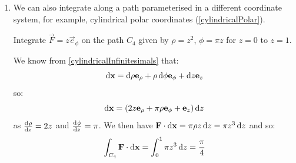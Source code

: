 \documentclass[../main.tex]{subfiles}
\begin{document}
\begin{example}
\begin{enumerate}
      We can parametrise this ellipse as $\vec{x}(\theta) = (a \cos \theta, b \sin \theta, 0)$ for $\theta \in [0, \frac{\pi}{2}]$.
      We then have:
      \[
        \vec{F}(\vec{x}(\theta)) = (b^2 \sin^2 \theta e^{a \cos \theta}, e^{b \sin \theta} + 2b\sin\theta e^{a \cos \theta}, 0)
      \]
      and:
      \[
        \deriv{\vec{x}}{\theta} = (-a \sin \theta, b \cos \theta, 0)
      \]
      so:
      \[
        \vec{F} \cdot \deriv{\vec{x}}{\theta} = -ab^2 \sin^3 \theta e^{a \cos \theta} + b \cos \theta e^{b \sin \theta} + 2b^2 \sin \theta \cos \theta e^{a \cos \theta}
      \]
      We can now evaluate the integral:
      \begin{align*}
        \int_{C_3} \vec{F} \cdot \d{\vec{x}} &= \eval{e^{b \sin \theta}}{0}{\pi/2} + \int_{0}^{\pi/2} b^2 \sin \theta e^{a \cos \theta} (-a + 2\cos \theta + a \cos^2 \theta) \d{\theta} \\
                                             &= e^{b} - 1 + \int_{1}^{0} b^2e^{au}(1 - 2u - au^2) \d{u} \text{ using $u = \cos \theta$}\\
                                             &= e^{b} - 1 + \eval{b^2 e^{au}(1 - u^2)}{1}{0} \\
                                             &= e^{b} - 1 + b^2
      \end{align*}
      If we instead went around the whole ellipse, starting at $(a, 0, 0)$ and going anticlockwise all the way around, we would find that $\oint \vec{F} \cdot \d{\vec{x}} = 0$.
    \item We can also integrate along a path parameterised in a different coordinate system, for example, cylindrical polar coordinates (\cref{cylindricalPolar}).

      Integrate $\vec{F} = z \vec{e}_\phi$ on the path $C_4$ given by $\rho = z^2$, $\phi = \pi z$ for $z = 0$ to $z = 1$.

      We know from \cref{cylindricalInfinitesimals} that:
      \[
        \d{\vec{x}} = \d{\rho}\vec{e}_\rho + \rho \d{\phi}\vec{e}_\phi + \d{z}\vec{e}_z
      \]
      so:
      \[
        \d{\vec{x}} = (2z\vec{e}_\rho + \pi \rho \vec{e}_\phi + \vec{e}_z) \d{z}
      \]
      as $\deriv{\rho}{z} = 2z$ and $\deriv{\phi}{z} = \pi$.
      We then have $\vec{F} \cdot \d{\vec{x}} = \pi \rho z \d{z} = \pi z^3 \d{z}$ and so:
      \[
        \int_{C_4} \vec{F} \cdot \d{\vec{x}} = \int_{0}^{1} \pi z^3 \d{z} = \frac{\pi}{4}
      \]
  \end{enumerate}
\end{example}
\end{document}
